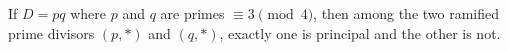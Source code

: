 If $D = pq$ where $p$ and $q$ are primes $\equiv 3 \pmod{4}$, then among the two ramified prime divisors $(p, *)$ and $(q, *)$, exactly one is principal and the other is not.

